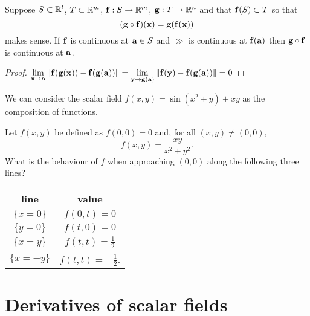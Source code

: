 \begin{theorem}
    Suppose \(S \subset \bR^l\), \(T\subset \bR^m\), \(\ff:S \to \bR^m\), \(\gg : T \to \bR^n\) and that \(\ff(S) \subset T\) so that
    \[(\gg \circ \ff)(\xx) = \gg(\ff(\xx))\]
    makes sense.
    If \(\ff\) is continuous at \(\aa\in S\) and \(\gg\) is continuous at \(\ff(\aa)\) then \(\gg\circ \ff\) is continuous at \(\aa\).
\end{theorem}

\begin{proof}
    \(\displaystyle\lim_{\xx\to\aa}\norm{\ff(\gg(\xx))-\ff(\gg(\aa))}  =\displaystyle\lim_{\yy\to\gg(\aa)}\norm{\ff(\yy)-\ff(\gg(\aa))}  =0   \)
\end{proof}

\begin{example*}
    We can consider the scalar field \(f(x,y)= \sin(x^2 + y) + x y\) as the composition of functions.
\end{example*}



\begin{example*}
    Let \(f(x,y)\) be defined as \(f(0,0)=0\) and, for all \((x,y)\neq (0,0)\),
    \[
        f(x,y) =
        \frac{x y}{x^2 + y^2}.
    \]
    What is the behaviour of \(f\) when approaching \((0,0)\) along the following three lines?
    \begin{center}
        \begin{tabular}{ c | c }
            line         & value                     \\
            \hline
            \(\{x=0\}\)  & \(f(0,t) =  0\)           \\
            \(\{y=0\}\)  & \(f(t,0) = 0\)            \\
            \(\{x=y\}\)  & \(f(t,t) = \frac{1}{2}\)  \\
            \(\{x=-y\}\) & \(f(t,t) =-\frac{1}{2}\).
        \end{tabular}
    \end{center}
\end{example*}



\section{Derivatives of scalar fields}


